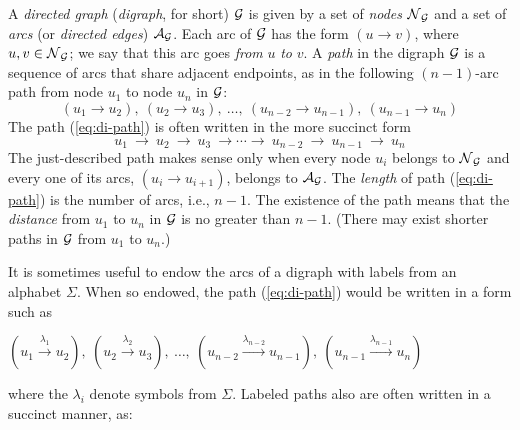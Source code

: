 A {\it directed graph}  ({\it digraph},
 for short) $\mbox{$\cal G$}$ is given by a set of {\it nodes}
$\mbox{$\cal N$}_{\mbox{{\scriptsize $\cal G$}}}$ and a set of {\it arcs}
(or {\it directed edges}) $\mbox{$\cal A$}_{\mbox{{\scriptsize $\cal G$}}}$.
Each arc of $\mbox{$\cal G$}$ has the form $(u \rightarrow v)$,
where $u, v \in \mbox{$\cal N$}_{\mbox{{\scriptsize $\cal G$}}}$; we say that this arc goes {\em from} $u$
{\em to} $v$.  A {\it path} 
in the digraph $\mbox{$\cal G$}$ is a sequence of arcs that share adjacent
endpoints, as in the following $(n-1)$-arc path from node $u_1$ to
node $u_n$ in $\mbox{$\cal G$}$:
\begin{equation}
\label{eq:di-path}
(u_1 \rightarrow u_2), \ (u_2 \rightarrow u_3), \ \ldots, \ (u_{n-2}
        \rightarrow u_{n-1}), \ (u_{n-1} \rightarrow u_n)
\end{equation}
The path (\ref{eq:di-path}) is often written in the more succinct form
\[
u_1 \ \rightarrow \ u_2 \ \rightarrow \ u_3 \ \rightarrow \cdots
\rightarrow \ u_{n-2} \ \rightarrow \ u_{n-1} \ \rightarrow \ u_n
\]
The just-described path makes sense only when every node $u_i$ belongs
to $\mbox{$\cal N$}_{\mbox{{\scriptsize $\cal G$}}}$ and every one of its arcs, $(u_i \rightarrow u_{i+1})$,
belongs to $\mbox{$\cal A$}_{\mbox{{\scriptsize $\cal G$}}}$.  The {\it length} of path (\ref{eq:di-path}) is
the number of arcs, i.e., $n-1$.  The existence of the path means that
the {\it distance} 
  from
$u_1$ to $u_n$ in $\mbox{$\cal G$}$ is no greater than $n-1$.  (There may exist
shorter paths in $\mbox{$\cal G$}$ from $u_1$ to $u_n$.)

\medskip

It is sometimes useful to endow the arcs of a digraph with labels from
an alphabet $\Sigma$.  When so endowed, the path (\ref{eq:di-path})
would be written in a form such as

\smallskip

\hspace*{.35in}$\displaystyle
(u_1 \stackrel{\lambda_1}{\rightarrow} u_2), \ 
(u_2 \stackrel{\lambda_2}{\rightarrow} u_3), \ \ldots, \ 
(u_{n-2} \stackrel{\lambda_{n-2}}{\rightarrow} u_{n-1}), \ 
(u_{n-1} \stackrel{\lambda_{n-1}}{\rightarrow} u_n)$

\smallskip

\noindent
where the $\lambda_i$ denote symbols from $\Sigma$.  Labeled paths
also are often written in a succinct manner, as:


